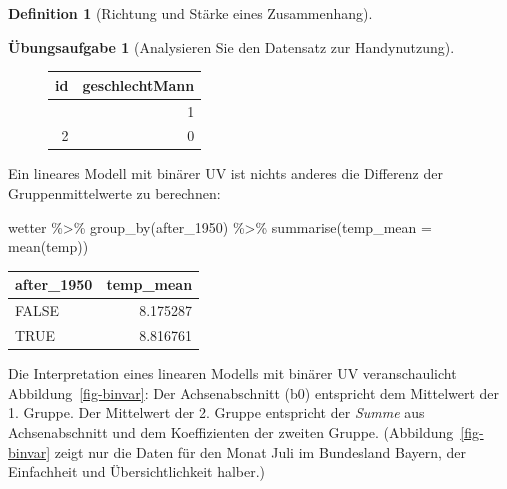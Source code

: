 \documentclass[
  a4paper,
  DIV=11]{scrreprt}
\newenvironment{Shaded}{\begin{snugshade}}{\end{snugshade}}
\newcommand{\AttributeTok}[1]{\textcolor[rgb]{0.40,0.45,0.13}{#1}}
\newcommand{\FunctionTok}[1]{\textcolor[rgb]{0.28,0.35,0.67}{#1}}
\newcommand{\NormalTok}[1]{\textcolor[rgb]{0.00,0.23,0.31}{#1}}
\newcommand{\SpecialCharTok}[1]{\textcolor[rgb]{0.37,0.37,0.37}{#1}}
\theoremstyle{definition}
\newtheorem{exercise}{Übungsaufgabe}[chapter]
\theoremstyle{definition}
\theoremstyle{definition}
\newtheorem{definition}{Definition}[chapter]
\theoremstyle{remark}
\begin{document}
\begin{definition}[Richtung und Stärke eines
Zusammenhang]
\begin{exercise}[Analysieren Sie den Datensatz zur
Handynutzung]
\begin{figure}
\begin{minipage}{0.40\linewidth}
\begin{longtable}[]{@{}rr@{}}
\toprule\noalign{}
id & geschlechtMann \\
\midrule\noalign{}
\endhead
\bottomrule\noalign{}
\endlastfoot
1 & 1 \\
2 & 0 \\
\end{longtable}

\end{minipage}%

\end{figure}%

Ein lineares Modell mit binärer UV ist nichts anderes die Differenz der
Gruppenmittelwerte zu berechnen:

\begin{Shaded}
\begin{Highlighting}[]
\NormalTok{wetter }\SpecialCharTok{\%\textgreater{}\%} 
  \FunctionTok{group\_by}\NormalTok{(after\_1950) }\SpecialCharTok{\%\textgreater{}\%} 
  \FunctionTok{summarise}\NormalTok{(}\AttributeTok{temp\_mean =} \FunctionTok{mean}\NormalTok{(temp))}
\end{Highlighting}
\end{Shaded}

\begin{longtable}[]{@{}lr@{}}
\toprule\noalign{}
after\_1950 & temp\_mean \\
\midrule\noalign{}
\endhead
\bottomrule\noalign{}
\endlastfoot
FALSE & 8.175287 \\
TRUE & 8.816761 \\
\end{longtable}

Die Interpretation eines linearen Modells mit binärer UV veranschaulicht
Abbildung~\ref{fig-binvar}: Der Achsenabschnitt (b0) entspricht dem
Mittelwert der 1. Gruppe. Der Mittelwert der 2. Gruppe entspricht der
\emph{Summe} aus Achsenabschnitt und dem Koeffizienten der zweiten
Gruppe. (Abbildung~\ref{fig-binvar} zeigt nur die Daten für den Monat
Juli im Bundesland Bayern, der Einfachheit und Übersichtlichkeit
halber.)

\begin{figure}

\centering{

}
\end{figure}
\end{exercise}
\end{definition}
\end{document}
